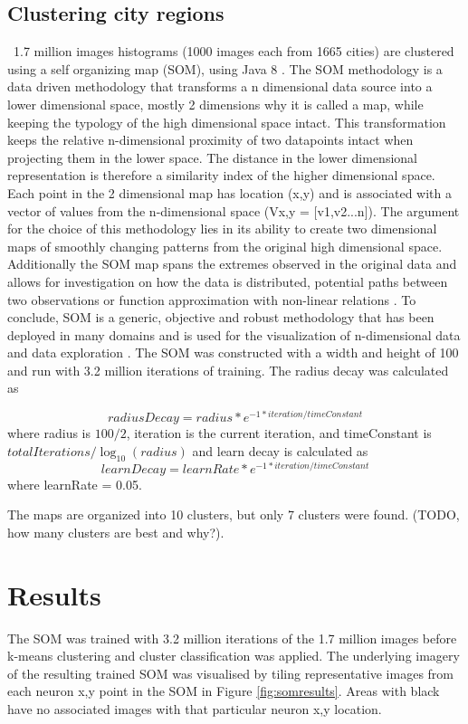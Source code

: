 \documentclass[final,3p,times,authoryear]{elsarticle}
\begin{document}
\subsection{Clustering city regions}\label{methodscluster}
~1.7 million images histograms (1000 images each from 1665 cities) are clustered using a self organizing map (SOM), using Java 8 \citep{Oracle2018}.  
The SOM methodology \citep{Kohonen1982} is a data driven methodology that transforms a n dimensional data source into a lower dimensional space, mostly 2 dimensions why it is called a map, while keeping the typology of the high dimensional space intact. This transformation keeps the relative n-dimensional proximity of two datapoints intact when projecting them in the lower space. The distance in the lower dimensional representation is therefore a similarity index of the higher dimensional space. Each point in the 2 dimensional map has location (x,y) and is associated with a vector of values from the n-dimensional space (Vx,y = [v1,v2...n]).
The argument for the choice of this methodology lies in its ability to create two dimensional maps of smoothly changing patterns from the original high dimensional space. Additionally the SOM map spans the extremes observed in the original data and allows for investigation on how the data is distributed, potential paths between two observations or function approximation with non-linear relations \citep{Barreto2006}. 
To conclude, SOM is a generic, objective and robust methodology that has been deployed in many domains and is used for the visualization of n-dimensional data and data exploration \citep{Koleheimen2004}.
The SOM was constructed with a width and height of 100 and run with 3.2 million iterations of training. The radius decay was calculated as


\begin{equation} 
radiusDecay = radius * e^{-1 * iteration / timeConstant}
\end{equation}
where radius is $100/2$, iteration is the current iteration, and timeConstant is $totalIterations / \log _{10} (radius)$ and learn decay is calculated as
\begin{equation} 
learnDecay = learnRate * e^{-1 * iteration / timeConstant}
\end{equation}
where learnRate = 0.05.




The maps are organized into 10 clusters, but only 7 clusters were found. (TODO, how many clusters are best and why?). 


\section{Results}\label{results}
The SOM was trained with 3.2 million iterations of the 1.7 million images before k-means clustering and cluster classification was applied. The underlying imagery of the resulting trained SOM was visualised by tiling representative images from each neuron x,y point in the SOM in Figure \ref{fig:somresults}. Areas with black have no associated images with that particular neuron x,y location.
\end{document}
